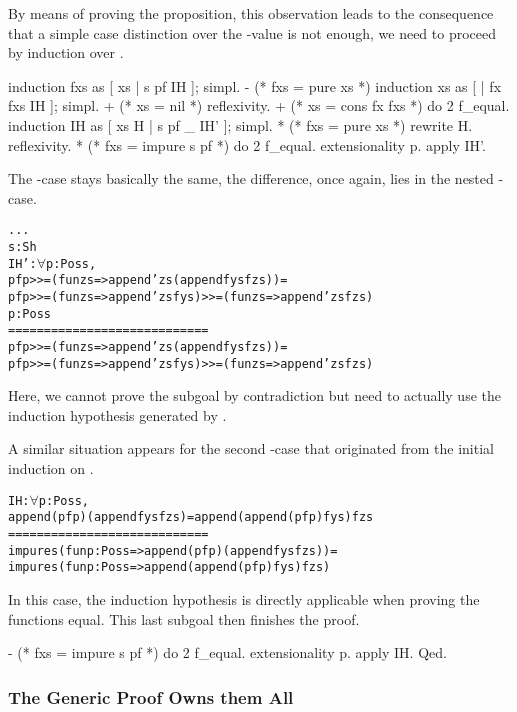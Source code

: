 By means of proving the proposition, this observation leads to the consequence that a simple case distinction over the \--value  is not enough, we need to proceed by induction over .

\begin{coqcode}
 induction fxs as [ xs | s pf IH ]; simpl.
 - (* fxs = pure xs *) induction xs as [ | fx fxs IH ]; simpl.
   + (* xs = nil *) reflexivity.
   + (* xs = cons fx fxs *) do 2 f_equal.
     induction IH as [ xs H | s pf _ IH' ]; simpl.
     * (* fxs = pure xs *) rewrite H. reflexivity.
     * (* fxs = impure s pf *) do 2 f_equal. extensionality p.
       apply IH'.
\end{coqcode}

The \--case stays basically the same, the difference, once again, lies in the nested \--case.

\begin{alltt}
  ...
  s : Sh
  IH' : \(\forall\) p : Pos s,
        pf p >>= (fun zs => append' zs (append fys fzs)) =
        pf p >>= (fun zs => append' zs fys) >>= (fun zs => append' zs fzs)
  p : Pos s
  ============================
  pf p >>= (fun zs => append' zs (append fys fzs)) =
  pf p >>= (fun zs => append' zs fys) >>= (fun zs => append' zs fzs)
\end{alltt}

Here, we cannot prove the subgoal by contradiction but need to actually use the induction hypothesis  generated by .

A similar situation appears for the second \--case that originated from the initial induction on .
\begin{alltt}
  IH : \(\forall\) p : Pos s,
       append (pf p) (append fys fzs) = append (append (pf p) fys) fzs
  ============================
  impure s (fun p : Pos s => append (pf p) (append fys fzs)) =
  impure s (fun p : Pos s => append (append (pf p) fys) fzs)
\end{alltt}

In this case, the induction hypothesis is directly applicable when proving the functions equal.
This last subgoal then finishes the proof.

\begin{coqcode}
 - (* fxs = impure s pf *) do 2 f_equal. extensionality p.
   apply IH.
Qed.
\end{coqcode}

\subsubsection{The Generic Proof Owns them All}

